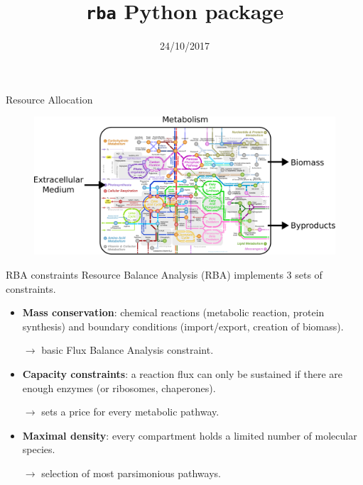 \documentclass{beamer}
\begin{document}
\title{\texttt{rba} Python package}
\date{24/10/2017}
\maketitle

\begin{frame}{Resource Allocation}
  \begin{figure}[!ht]
    \centering
    \includegraphics[width=\linewidth]{intro}
  \end{figure}
\end{frame}

\begin{frame}{RBA constraints}
  Resource Balance Analysis (RBA) implements 3 sets of constraints.
  \begin{itemize}
    \item \textbf{Mass conservation}: chemical reactions
    (metabolic reaction, protein synthesis)
    and boundary conditions (import/export, creation of biomass).

    $\rightarrow$ basic Flux Balance Analysis constraint.

    \item \textbf{Capacity constraints}: a reaction flux can only be sustained
    if there are enough enzymes (or ribosomes, chaperones).

    $\rightarrow$ sets a price for every metabolic pathway.

    \item \textbf{Maximal density}: every compartment holds a limited number
    of molecular species.

    $\rightarrow$ selection of most parsimonious pathways.
  \end{itemize}
\end{frame}
\end{document}
